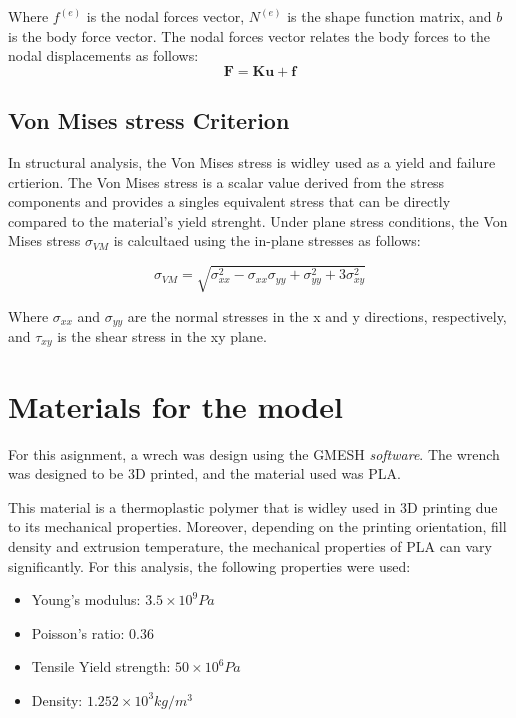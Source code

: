 \documentclass{article}  %
\begin{document}
Where $f^{(e)}$ is the nodal forces vector, $N^{(e)}$ is the shape function matrix, and $b$ is the body force vector. The nodal forces vector relates the body forces to the nodal displacements as follows:
\begin{equation}
  \mathbf{F} = \mathbf{K} \mathbf{u} + \mathbf{f}
\end{equation}

\subsection{Von Mises stress Criterion}

In structural analysis, the Von Mises stress is widley used as a yield and failure crtierion. The Von Mises stress is a scalar value derived from the stress components and provides a singles equivalent stress that can be directly compared to the material's yield strenght.
Under plane stress conditions, the Von Mises stress $\sigma_{VM}$ is calcultaed using the in-plane stresses as follows:

\begin{equation}
  \sigma_{VM} = \sqrt{ \sigma_{xx}^2 - \sigma_{xx} \sigma_{yy} + \sigma_{yy}^2 + 3\sigma_{xy}^2 }
\end{equation}
  

Where $\sigma_{xx}$ and $\sigma_{yy}$ are the normal stresses in the x and y directions, respectively, and $\tau_{xy}$ is the shear stress in the xy plane. 
\newpage

\section{Materials for the model}

For this asignment, a wrech was design using the GMESH \textit{software}. The wrench was designed to be 3D printed, and the material used was PLA. 

This material is a thermoplastic polymer that is widley used in 3D printing due to its mechanical properties. Moreover, depending on the printing orientation, fill density and extrusion temperature, the mechanical properties of PLA can vary significantly. For this analysis, the following properties were used:

\begin{itemize}
  \item Young's modulus: $3.5 \times 10^9 Pa$
  \item Poisson's ratio: 0.36
  \item Tensile Yield strength: $50 \times 10^6 Pa $
  \item Density: $1.252 \times 10^3 kg/m^3$
\end{itemize}
\end{document}
